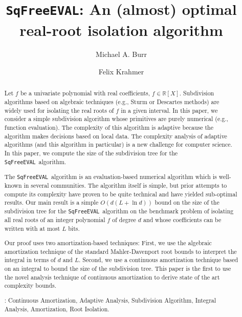\documentclass{amsart}
\theoremstyle{definition}
\newcommand{\EVAL}{\texttt{SqFreeEVAL}}
\begin{document}
\title{\EVAL: An (almost) optimal real-root isolation algorithm}

\author{Michael A. Burr}
\address{Fordham University, 441 East Fordham Road, Bronx, NY 10458, USA}

\author{Felix Krahmer}
\address{Hausdorff Center for Mathematics, Universit\"at Bonn, Endenicher Allee 60, 53115 Bonn, Germany}

\begin{abstract}
Let $f$ be a univariate polynomial with real coefficients, $f\in\mathbb{R}[X]$.  Subdivision algorithms based on algebraic techniques (e.g., Sturm or Descartes methods) are widely used for isolating the real roots of $f$ in a given interval. In this paper, we consider a simple subdivision algorithm whose primitives are purely numerical (e.g., function evaluation).  The complexity of this algorithm is adaptive because the algorithm makes decisions based on local data.  The complexity analysis of adaptive algorithms (and this algorithm in particular) is a new challenge for computer science. In this paper, we compute the size of the subdivision tree for the \EVAL\ algorithm.

The \EVAL\ algorithm is an evaluation-based numerical algorithm which is well-known in several communities.  The algorithm itself is simple, but prior attempts to compute its complexity have proven to be quite technical and have yielded sub-optimal results.  Our main result is a simple $O(d(L+\ln d))$ bound on the size of the subdivision tree for the \EVAL\ algorithm on the benchmark problem of isolating all real roots of an integer polynomial $f$ of degree $d$ and whose coefficients can be written with at most $L$ bits.

Our proof uses two amortization-based techniques: First, we use the algebraic amortization technique of the standard Mahler-Davenport root bounds to interpret the integral in terms of $d$ and $L$.  Second, we use a continuous amortization technique based on an integral to bound the size of the subdivision tree.  This paper is the first to use the novel analysis technique of continuous amortization to derive state of the art complexity bounds.

: Continuous Amortization, Adaptive Analysis, Subdivision Algorithm, Integral Analysis, Amortization, Root Isolation.
\end{abstract}

\maketitle
\end{document}
